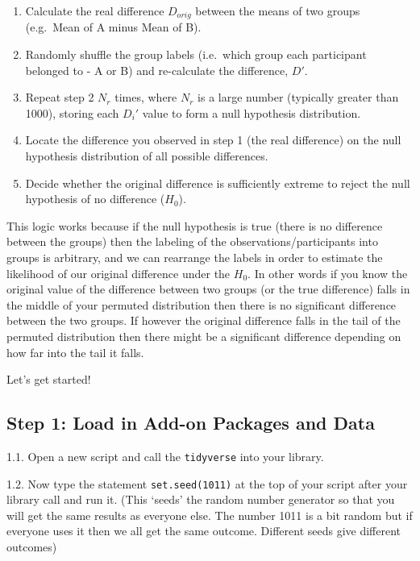 \documentclass[]{book}
\providecommand{\tightlist}{%
  \setlength{\itemsep}{0pt}\setlength{\parskip}{0pt}}
\begin{document}
\begin{enumerate}
\def\labelenumi{\arabic{enumi}.}
\tightlist
\item
  Calculate the real difference \(D_{orig}\) between the means of two groups (e.g.~Mean of A minus Mean of B).
\item
  Randomly shuffle the group labels (i.e.~which group each participant belonged to - A or B) and re-calculate the difference, \(D'\).
\item
  Repeat step 2 \(N_{r}\) times, where \(N_r\) is a large number (typically greater than 1000), storing each \(D_i'\) value to form a null hypothesis distribution.
\item
  Locate the difference you observed in step 1 (the real difference) on the null hypothesis distribution of all possible differences.
\item
  Decide whether the original difference is sufficiently extreme to reject the null hypothesis of no difference (\(H_0\)).
\end{enumerate}

This logic works because if the null hypothesis is true (there is no difference between the groups) then the labeling of the observations/participants into groups is arbitrary, and we can rearrange the labels in order to estimate the likelihood of our original difference under the \(H_0\). In other words if you know the original value of the difference between two groups (or the true difference) falls in the middle of your permuted distribution then there is no significant difference between the two groups. If however the original difference falls in the tail of the permuted distribution then there might be a significant difference depending on how far into the tail it falls.

Let's get started!

\hypertarget{Ch5InClassQueT1}{%
\subsection{Step 1: Load in Add-on Packages and Data}\label{Ch5InClassQueT1}}

1.1. Open a new script and call the \texttt{tidyverse} into your library.

1.2. Now type the statement \texttt{set.seed(1011)} at the top of your script after your library call and run it. (This `seeds' the random number generator so that you will get the same results as everyone else. The number 1011 is a bit random but if everyone uses it then we all get the same outcome. Different seeds give different outcomes)
\end{document}
